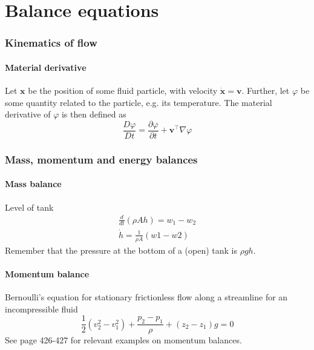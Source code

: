 \part{Balance equations}
\section{Kinematics of flow}
\subsection{Material derivative}
Let $\mathbf{x}$ be the position of some fluid particle, with velocity $\dot{\mathbf{x}} = \mathbf{v}$. Further, let $\varphi$ be some quantity related to the particle, e.g. its temperature. The material derivative of $\varphi$ is then defined as
\begin{equation}
    \frac{D\varphi}{Dt} = \frac{\partial \varphi}{\partial t} + \mathbf{v}^\top \nabla \varphi
\end{equation}

\section{Mass, momentum and energy balances}
\subsection{Mass balance}
Level of tank
\begin{align}
    \frac{d}{dt}(\rho A h) = w_1 - w_2\\
    \dot{h} = \frac{1}{\rho A} (w1 - w2)
\end{align}
Remember that the pressure at the bottom of a (open) tank is $\rho g h$.

\subsection{Momentum balance}
Bernoulli's equation for stationary frictionless flow along a streamline for an incompressible fluid
\begin{equation}
    \frac{1}{2} (v_2^2 - v_1^2) + \frac{p_2 - p_1}{\rho} + (z_2 - z_1)g = 0
\end{equation}
See page 426-427 for relevant examples on momentum balances.

